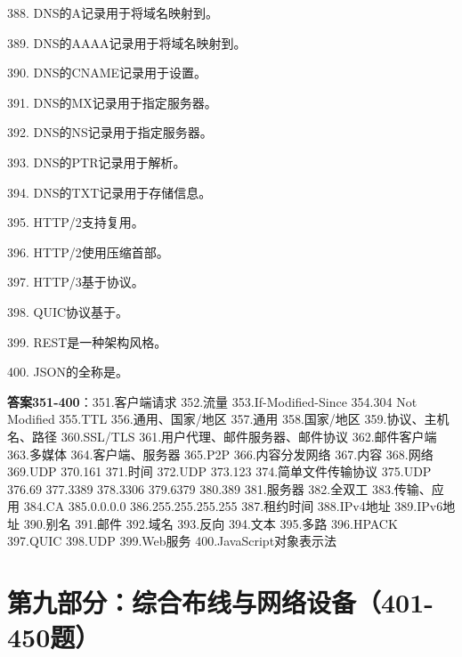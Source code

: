 388. DNS的A记录用于将域名映射到\underline{\hspace{2cm}}。

389. DNS的AAAA记录用于将域名映射到\underline{\hspace{2cm}}。

390. DNS的CNAME记录用于设置\underline{\hspace{2cm}}。

391. DNS的MX记录用于指定\underline{\hspace{2cm}}服务器。

392. DNS的NS记录用于指定\underline{\hspace{2cm}}服务器。

393. DNS的PTR记录用于\underline{\hspace{2cm}}解析。

394. DNS的TXT记录用于存储\underline{\hspace{2cm}}信息。

395. HTTP/2支持\underline{\hspace{2cm}}复用。

396. HTTP/2使用\underline{\hspace{2cm}}压缩首部。

397. HTTP/3基于\underline{\hspace{2cm}}协议。

398. QUIC协议基于\underline{\hspace{2cm}}。

399. REST是一种\underline{\hspace{2cm}}架构风格。

400. JSON的全称是\underline{\hspace{4cm}}。

\textbf{答案351-400}：351.客户端请求 352.流量 353.If-Modified-Since 354.304 Not Modified 355.TTL 356.通用、国家/地区 357.通用 358.国家/地区 359.协议、主机名、路径 360.SSL/TLS 361.用户代理、邮件服务器、邮件协议 362.邮件客户端 363.多媒体 364.客户端、服务器 365.P2P 366.内容分发网络 367.内容 368.网络 369.UDP 370.161 371.时间 372.UDP 373.123 374.简单文件传输协议 375.UDP 376.69 377.3389 378.3306 379.6379 380.389 381.服务器 382.全双工 383.传输、应用 384.CA 385.0.0.0.0 386.255.255.255.255 387.租约时间 388.IPv4地址 389.IPv6地址 390.别名 391.邮件 392.域名 393.反向 394.文本 395.多路 396.HPACK 397.QUIC 398.UDP 399.Web服务 400.JavaScript对象表示法


\section{第九部分：综合布线与网络设备（401-450题）}


